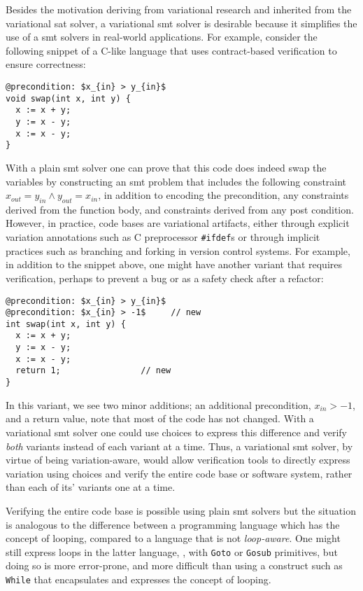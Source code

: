Besides the motivation deriving from variational research and inherited from the
variational \ac{sat} solver, a variational \ac{smt} solver is desirable because
it simplifies the use of a \ac{smt} solvers in real-world applications.
%
For example, consider the following snippet of a C-like language that uses
contract-based verification to ensure correctness:
%
\begin{lstlisting}[columns=flexible,keepspaces=true]
@precondition: $x_{in} > y_{in}$
void swap(int x, int y) {
  x := x + y;
  y := x - y;
  x := x - y;
}
\end{lstlisting}
%
With a plain \ac{smt} solver one can prove that this code does indeed swap the
variables by constructing an \ac{smt} problem that includes the following
constraint $x_{out} = y_{in} \wedge y_{out} = x_{in}$, in addition to encoding
the precondition, any constraints derived from the function body, and
constraints derived from any post condition. However, in practice, code bases
are variational artifacts, either through explicit variation annotations such as
C preprocessor \texttt{\#ifdef}s or through implicit practices such as branching
and forking in version control systems. For example, in addition to the snippet
above, one might have another variant that requires verification, perhaps to
prevent a bug or as a safety check after a refactor:
%
\begin{lstlisting}[columns=flexible,keepspaces=true]
@precondition: $x_{in} > y_{in}$
@precondition: $x_{in} > -1$     // new
int swap(int x, int y) {
  x := x + y;
  y := x - y;
  x := x - y;
  return 1;                // new
}
\end{lstlisting}
%
In this variant, we see two minor additions; an additional precondition, $x_{in}
> -1$, and a return value, note that most of the code has not changed. With a
variational \ac{smt} solver one could use choices to express this difference and
verify \emph{both} variants instead of each variant at a time. Thus, a
variational \ac{smt} solver, by virtue of being variation-aware, would allow
verification tools to directly express variation using choices and verify the
entire code base or software system, rather than each of its' variants one at a
time.

Verifying the entire code base is possible using plain \ac{smt} solvers but the
situation is analogous to the difference between a programming language which
has the concept of looping, compared to a language that is not
\emph{loop-aware}. One might still express loops in the latter language, \eg{},
with \texttt{Goto} or \texttt{Gosub} primitives, but doing so is more
error-prone, and more difficult than using a construct such as \texttt{While}
that encapsulates and expresses the concept of looping.

